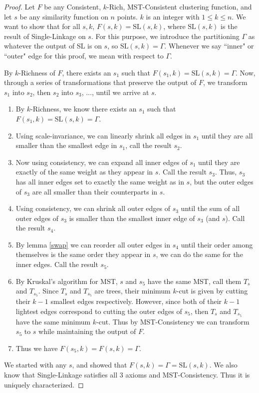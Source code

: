 \documentclass[twoside,11pt]{article}
\newcommand{\SL}{\text{SL}}
\begin{document}
\begin{proof}

Let $F$ be any Consistent, $k$-Rich, MST-Consistent clustering function, and let $s$ be any similarity function on $n$ points. $k$ is an integer with $1 \leq k \leq n$. We want to show that for all $s,k$, $F(s,k) = \SL(s,k)$, where $\SL(s,k)$ is the result of Single-Linkage on $s$. For this purpose, we introduce the partitioning $\Gamma$ as whatever the output of SL is on $s$, so $\SL(s,k)=\Gamma$. Whenever we say ``inner" or ``outer" edge for this proof, we mean with respect to $\Gamma$.

By $k$-Richness of $F$, there exists an $s_1$ such that $F(s_1,k) = \SL(s,k) = \Gamma$. Now, through a series of transformations that preserve the output of $F$, we transform $s_1$ into $s_2$, then $s_2$ into $s_3$, $\ldots$, until we arrive at $s$.
\begin{enumerate}
	\item By $k$-Richness, we know there exists an $s_1$ such that $F(s_1, k) = \SL(s, k) = \Gamma$.
	\item Using scale-invariance, we can linearly shrink all edges in $s_1$ until they are all smaller than the smallest edge in $s_1$, call the result $s_2$.
	\item Now using consistency, we can expand all inner edges of $s_1$ until they are exactly of the same weight as they appear in $s$. Call the result $s_3$. Thus, $s_3$ has all inner edges set to exactly the same weight as in $s$, but the outer edges of $s_3$ are all smaller than their counterparts in $s$.
	\item Using consistency, we can shrink all outer edges of $s_3$ until the sum of all outer edges of $s_3$ is smaller than the smallest inner edge of $s_3$ (and $s$). Call the result $s_4$.
	\item By lemma \ref{swap} we can reorder all outer edges in $s_4$ until their order among themselves is the same order they appear in $s$, we can do the same for the inner edges. Call the result $s_5$.	
	\item By Kruskal's algorithm for MST, $s$ and $s_5$ have the same MST, call them $T_s$ and $T_{s_5}$. Since $T_s$ and $T_{s_5}$ are trees, their minimum $k$-cut is given by cutting their $k-1$ smallest edges respectively.
However, since both of their $k-1$ lightest edges correspond to cutting the outer edges of $s_5$, then $T_s$ and $T_{s_5}$ have the same minimum $k$-cut. Thus
by MST-Consistency we can transform $s_5$ to $s$ while maintaining the output of $F$.
	\item Thus we have $F(s_5,k) = F(s,k) = \Gamma$.
\end{enumerate}
We started with any $s$, and showed that $F(s,k) = \Gamma = \SL(s,k)$.
We also know that Single-Linkage satisfies all 3 axioms \citep{bosagh2009} and MST-Consistency. Thus
it is uniquely characterized.
\end{proof}
\end{document}
